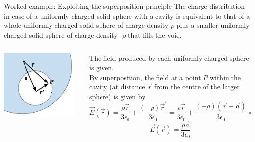 {\begin{frame}{Worked example: Exploiting the superposition principle}
  The charge distribution in case of a uniformly charged solid sphere
  with a cavity is equivalent to that of
  a whole uniformly charged solid sphere of charge density $\rho$
  plus a smaller uniformly charged solid sphere
  of charge density -$\rho$ that fills the void.\\
  \vspace{0.2cm}

  \begin{columns}
    \begin{column}{0.38\textwidth}
      \begin{center}
        \includegraphics[width=0.95\textwidth]{./images/problems/lect02_sphere_with_cavity_distances_2}
      \end{center}
    \end{column}
    \begin{column}{0.62\textwidth}
      The field produced by each uniformly charged sphere is given.\\
      By superposition, the field at a point $P$ within the cavity
      (at distance $\vec{r}$ from the centre of the larger sphere)
      is given by
      \begin{equation*}
        \vec{E}(\vec{r}) =
        \frac{\rho \vec{r}}{3 \epsilon_0} +
        \frac{(-\rho) \vec{r}^\prime}{3 \epsilon_0} =
           \frac{\rho \vec{r}}{3 \epsilon_0} +
           \frac{(-\rho) (\vec{r} - \vec{a})}{3 \epsilon_0} \Rightarrow
      \end{equation*}
      \begin{equation*}
        \vec{E}(\vec{r}) =
           \frac{\rho \vec{a}}{3 \epsilon_0}
      \end{equation*}
    \end{column}
  \end{columns}

\end{frame}

} %


